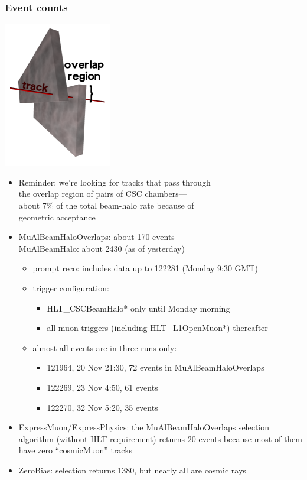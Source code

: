 \documentclass[compress]{beamer}
\begin{document}
\begin{frame}
\frametitle{Event counts}

\vspace{0.5 cm}
\hfill \includegraphics[height=2.5 cm]{overlaps.png}

\vspace{-3 cm}
\begin{itemize}
\item Reminder: we're looking for tracks that pass through \\ the overlap region of pairs of CSC chambers--- \\ about 7\% of the total beam-halo rate because of \\ geometric acceptance

\item MuAlBeamHaloOverlaps: about 170 events \\ MuAlBeamHalo: about 2430 (as of yesterday)
\begin{itemize}
\item prompt reco: includes data up to 122281 {\scriptsize (Monday 9:30 GMT)}
\item trigger configuration:
\begin{itemize}
\item HLT\_CSCBeamHalo* only until Monday morning
\item all muon triggers {\scriptsize (including HLT\_L1OpenMuon*)} thereafter
\end{itemize}
\item almost all events are in three runs only:
\begin{itemize}
\item 121964, 20 Nov 21:30, 72 events in MuAlBeamHaloOverlaps
\item 122269, 23 Nov  4:50, 61 events
\item 122270, 32 Nov  5:20, 35 events
\end{itemize}
\end{itemize}

\item ExpressMuon/ExpressPhysics: the MuAlBeamHaloOverlaps selection algorithm {\scriptsize (without HLT requirement)} returns 20 events because most of them have zero ``cosmicMuon'' tracks

\item ZeroBias: selection returns 1380, but nearly all are cosmic rays
\end{itemize}
\end{frame}
\end{document}
